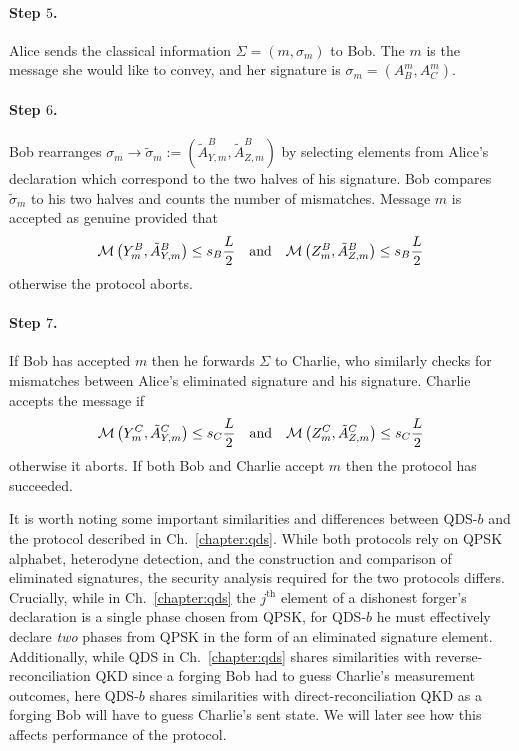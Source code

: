 \paragraph{Step $5$.} Alice sends the classical information $\Sigma = \left(m, \sigma_m\right)$ to Bob. The $m$ is the message she would like to convey, and her signature is $\sigma_m = \left(A_B^m, A_C^m\right)$. 

\paragraph{Step $6$.} Bob rearranges $\sigma_m \rightarrow \tilde{\sigma}_m := \left(\tilde{A}_{Y, m}^B, \tilde{A}_{Z, m}^B\right)$ by selecting elements from Alice's declaration which correspond to the two halves of his signature. Bob compares $\tilde{\sigma}_m$ to his two halves and counts the number of mismatches. Message $m$ is accepted as genuine provided that
\begin{equation}
\mathcal{M}\left(Y_m^B, \tilde{A}_{Y, m}^B\right) \le s_B \frac{L}{2} \qq{and} \mathcal{M}\left(Z_m^B, \tilde{A}_{Z, m}^B\right) \le s_B \frac{L}{2}
\end{equation}
otherwise the protocol aborts. %

\paragraph{Step $7$.} If Bob has accepted $m$ then he forwards $\Sigma$ to Charlie, who similarly checks for mismatches between Alice's eliminated signature and his signature. Charlie accepts the message if
\begin{equation}
\mathcal{M}\left(Y_m^C, \tilde{A}_{Y, m}^C\right) \le s_C \frac{L}{2} \qq{and} \mathcal{M}\left(Z_m^C, \tilde{A}_{Z, m}^C\right) \le s_C \frac{L}{2}
\end{equation}
otherwise it aborts. %
If both Bob and Charlie accept $m$ then the protocol has succeeded. 

It is worth noting some important similarities and differences between QDS-$b$ and the protocol described in Ch.~\ref{chapter:qds}. While both protocols rely on QPSK alphabet, heterodyne detection, and the construction and comparison of eliminated signatures, the security analysis required for the two protocols differs. Crucially, while in Ch.~\ref{chapter:qds} the $j^{\text{th}}$ element of a dishonest forger's declaration is a single phase chosen from QPSK, for QDS-$b$ he must effectively declare \emph{two} phases from QPSK in the form of an eliminated signature element. Additionally, while QDS in Ch.~\ref{chapter:qds} shares similarities with reverse-reconciliation QKD since a forging Bob had to guess Charlie's measurement outcomes, here QDS-$b$ shares similarities with direct-reconciliation QKD as a forging Bob will have to guess Charlie's sent state. We will later see how this affects performance of the protocol. 

